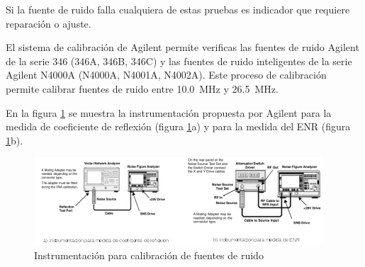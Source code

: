 Si la fuente de ruido falla cualquiera de estas pruebas es indicador que requiere reparación o ajuste.

El sistema de calibración de Agilent permite verificas las fuentes de ruido Agilent de la serie 346 (346A, 346B, 346C) y las fuentes de ruido inteligentes de la serie Agilent N4000A (N4000A, N4001A, N4002A). Este proceso de calibración permite calibrar fuentes de ruido entre \SI{10.0}{\mega\hertz} y \SI{26.5}{\mega\hertz}. 

En la figura \ref{Fig:InstrumentacionCalibracion} se muestra la instrumentación propuesta por Agilent \cite{AGI03} para la medida de coeficiente de reflexión (figura \ref{Fig:InstrumentacionCalibracion}a) y para la medida del ENR (figura \ref{Fig:InstrumentacionCalibracion}b).		

\begin{figure}[h!]
\centering
\begin{minipage}{19.011cm}
	\includegraphics{Imagenes/InstrumentacionCalibracionFuentesRuido.png}
	\caption{ Instrumentación para calibración de fuentes de ruido \cite{AGI03}}
	\label{Fig:InstrumentacionCalibracion}
\end{minipage}
\end{figure}		

